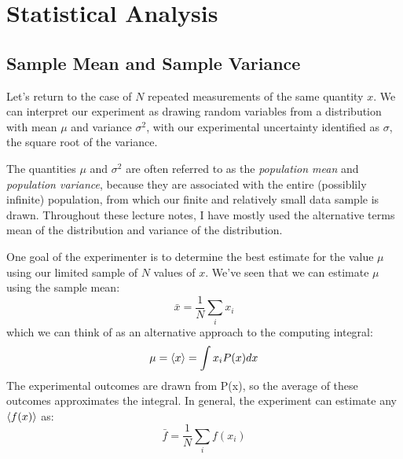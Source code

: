 \documentclass[12pt,oneside]{book}
\begin{document}
\chapter{Statistical Analysis}

\section{Sample Mean and Sample Variance}

Let's return to the case of $N$ repeated measurements of the same
quantity $x$.  We can interpret our experiment as drawing random
variables from a distribution with mean $\mu$ and variance $\sigma^2$,
with our experimental uncertainty identified as $\sigma$, the square
root of the variance.

The quantities $\mu$ and $\sigma^2$ are often referred to as the
{\em population mean} and {\em population variance}, because they are associated
with the entire (possiblily infinite) population, from which our
finite and relatively small data sample is drawn.  Throughout these
lecture notes, I have mostly used the alternative terms mean of the
distribution and variance of the distribution.

One goal of the experimenter is to determine the best estimate for the
value $\mu$ using our limited sample of $N$ values of $x$.  We've seen that we can estimate $\mu$ using the sample mean:
\begin{displaymath}
\bar{x} = \frac{1}{N} \sum_i x_i
\end{displaymath}
which we can think of as an alternative approach to the computing integral:
\begin{displaymath}
\mu = \braket{x} = \int x_i P(x) dx
\end{displaymath}
The experimental outcomes are drawn from P(x), so the average of these outcomes approximates the integral.  In general, the experiment can estimate any $\braket{f(x)}$ as:
\begin{displaymath}
\bar{f} = \frac{1}{N} \sum_i f(x_i)
\end{displaymath}
\end{document}
